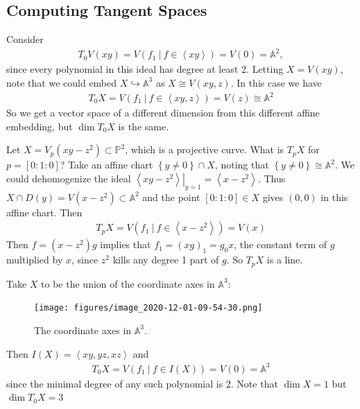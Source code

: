 \hypertarget{computing-tangent-spaces}{%
\subsection{Computing Tangent Spaces}\label{computing-tangent-spaces}}

\begin{example}[?]

Consider
\begin{align*}
T_0 V(xy) = V(f_1 {~\mathrel{\Big|}~}f\in \left\langle{xy}\right\rangle) = V(0) = {\mathbb{A}}^2
,\end{align*}
since every polynomial in this ideal has degree at least 2. Letting
\(X = V(xy)\), note that we could embed
\(X\hookrightarrow{\mathbb{A}}^3\) as \(X\cong V(xy, z)\). In this case
we have
\begin{align*}
T_0 X = V(f_1 {~\mathrel{\Big|}~}f\in \left\langle{xy, z}\right\rangle) = V(z) \cong {\mathbb{A}}^2
\end{align*}
So we get a vector space of a different dimension from this different
affine embedding, but \(\dim T_0 X\) is the same.

\end{example}

\begin{example}[?]

Let \(X = V_p(xy-z^2) \subset {\mathbb{P}}^2\), which is a projective
curve. What is \(T_p X\) for \(p = [0:1:0]\)? Take an affine chart
\(\left\{{y\neq 0}\right\} \cap X\), noting that
\(\left\{{y\neq 0}\right\} \cong {\mathbb{A}}^2\). We could dehomogenize
the ideal
\({ \left.{{\left\langle{xy-z^2}\right\rangle}} \right|_{{y=1}} } = \left\langle{x-z^2}\right\rangle\).
Thus \(X \cap D(y) = V(x-z^2) \subset {\mathbb{A}}^2\) and the point
\([0:1:0] \in X\) gives \((0, 0)\) in this affine chart. Then
\begin{align*}
T_p X = V(f_1 {~\mathrel{\Big|}~}f\in \left\langle{x-z^2}\right\rangle) = V(x)
\end{align*}
Then \(f = (x-z^2)g\) implies that \(f_1 = (xg)_1 = g_0 x\), the
constant term of \(g\) multiplied by \(x\), since \(z^2\) kills any
degree 1 part of \(g\). So \(T_p X\) is a line.

\end{example}

\begin{example}[?]

Take \(X\) to be the union of the coordinate axes in \({\mathbb{A}}^3\):

\begin{figure}
\centering
\texttt{[image: figures/image\_2020-12-01-09-54-30.png]}
\caption{The coordinate axes in \({\mathbb{A}}^3\).}
\end{figure}

Then \(I(X) = \left\langle{xy, yz, xz}\right\rangle\) and
\begin{align*}
T_0 X = V(f_1 {~\mathrel{\Big|}~}f\in I(X)) = V(0) = {\mathbb{A}}^3
\end{align*}
since the minimal degree of any such polynomial is 2. Note that
\(\dim X = 1\) but \(\dim T_0 X = 3\)

\end{example}

